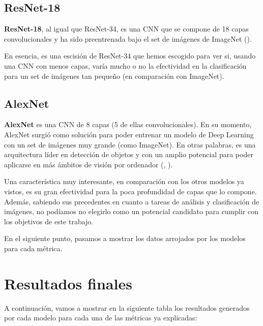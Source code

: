 \subsection{ResNet-18}

\textbf{ResNet-18}, al igual que ResNet-34, es una \ac{CNN} que se compone de 18 capas convolucionales y ha sido preentrenada bajo el set de imágenes de ImageNet (\cite{resnet18}).

En esencia, es una escisión de ResNet-34 que hemos escogido para ver si, usando una \ac{CNN} con menos capas, varía mucho o no la efectividad en la clasificación para un set de imágenes tan pequeño (en comparación con ImageNet).

\subsection{AlexNet}

\textbf{AlexNet} es una \ac{CNN} de 8 capas (5 de ellas convolucionales). En su momento, AlexNet surgió como solución para poder entrenar un modelo de Deep Learning con un set de imágenes muy grande (como ImageNet). En otras palabras, es una arquitectura líder en detección de objetos y con un amplio potencial para poder aplicarse en más ámbitos de visión por ordenador (\cite{alexnet}, \cite{alexnet-2}).

Una característica muy interesante, en comparación con los otros modelos ya vistos, es su gran efectividad para la poca profundidad de capas que lo compone. Además, sabiendo sus precedentes en cuanto a tareas de análisis y clasificación de imágenes, no podíamos no elegirlo como un potencial candidato para cumplir con los objetivos de este trabajo.

En el siguiente punto, pasamos a mostrar los datos arrojados por los modelos para cada métrica.

\newpage

\section{Resultados finales}

A continuación, vamos a mostrar en la siguiente tabla los resultados generados por cada modelo para cada una de las métricas ya explicadas:

